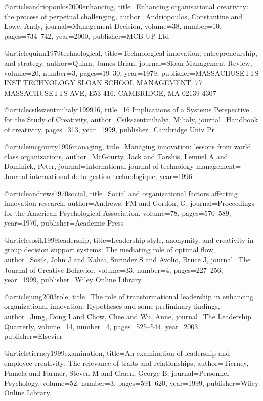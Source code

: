 @article{andriopoulos2000enhancing,
  title={Enhancing organisational creativity: the process of perpetual challenging},
  author={Andriopoulos, Constantine and Lowe, Andy},
  journal={Management Decision},
  volume={38},
  number={10},
  pages={734--742},
  year={2000},
  publisher={MCB UP Ltd}
}

@article{quinn1979technological,
  title={Technological innovation, entrepreneurship, and strategy},
  author={Quinn, James Brian},
  journal={Sloan Management Review},
  volume={20},
  number={3},
  pages={19--30},
  year={1979},
  publisher={MASSACHUSETTS INST TECHNOLOGY SLOAN SCHOOL MANAGEMENT, 77 MASSACHUSETTS AVE, E53-416, CAMBRIDGE, MA 02139-4307}
}

@article{csikszentmihalyi199916,
  title={16 Implications of a Systems Perspective for the Study of Creativity},
  author={Csikszentmihalyi, Mihaly},
  journal={Handbook of creativity},
  pages={313},
  year={1999},
  publisher={Cambridge Univ Pr}
}

@article{mcgourty1996managing,
  title={Managing innovation: lessons from world class organizations},
  author={McGourty, Jack and Tarshis, Lemuel A and Dominick, Peter},
  journal={International journal of technology management= Journal international de la gestion technologique},
  year={1996}
}

@article{andrews1970social,
  title={Social and organizational factors affecting innovation research},
  author={Andrews, FM and Gordon, G},
  journal={Proceedings for the American Psychological Association},
  volume={78},
  pages={570--589},
  year={1970},
  publisher={Academic Press}
}

@article{sosik1999leadership,
  title={Leadership style, anonymity, and creativity in group decision support systems: The mediating role of optimal flow},
  author={Sosik, John J and Kahai, Surinder S and Avolio, Bruce J},
  journal={The Journal of Creative Behavior},
  volume={33},
  number={4},
  pages={227--256},
  year={1999},
  publisher={Wiley Online Library}
}

@article{jung2003role,
  title={The role of transformational leadership in enhancing organizational innovation: Hypotheses and some preliminary findings},
  author={Jung, Dong I and Chow, Chee and Wu, Anne},
  journal={The Leadership Quarterly},
  volume={14},
  number={4},
  pages={525--544},
  year={2003},
  publisher={Elsevier}
}

@article{tierney1999examination,
  title={An examination of leadership and employee creativity: The relevance of traits and relationships},
  author={Tierney, Pamela and Farmer, Steven M and Graen, George B},
  journal={Personnel Psychology},
  volume={52},
  number={3},
  pages={591--620},
  year={1999},
  publisher={Wiley Online Library}
}


